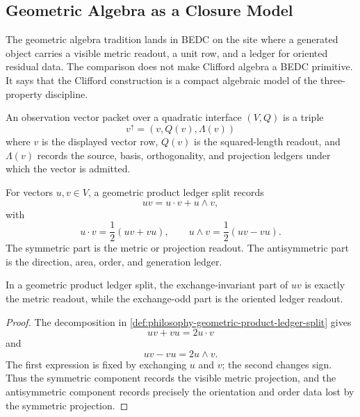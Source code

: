 \subsection{Geometric Algebra as a Closure Model}
\label{subsec:philosophy-geometric-algebra-closure-model}

\begin{definition}
\label{def:philosophy-geometric-algebra-genealogy}
The geometric algebra tradition lands in BEDC on the site where a
generated object carries a visible metric readout, a unit row, and a
ledger for oriented residual data. The comparison does not make
Clifford algebra a BEDC primitive. It says that the Clifford construction
is a compact algebraic model of the three-property discipline.
\end{definition}

\begin{definition}
\label{def:philosophy-observation-vector-packet}
An observation vector packet over a quadratic interface $(V,Q)$ is a
triple
$$
v^{\uparrow}=(v,Q(v),\Lambda(v))
$$
where $v$ is the displayed vector row, $Q(v)$ is the squared-length
readout, and $\Lambda(v)$ records the source, basis, orthogonality, and
projection ledgers under which the vector is admitted.
\end{definition}

\begin{definition}
\label{def:philosophy-geometric-product-ledger-split}
For vectors $u,v\in V$, a geometric product ledger split records
$$
uv=u\cdot v+u\wedge v,
$$
with
$$
u\cdot v=\frac12(uv+vu),
\qquad
u\wedge v=\frac12(uv-vu).
$$
The symmetric part is the metric or projection readout. The antisymmetric
part is the direction, area, order, and generation ledger.
\end{definition}

\begin{theorem}
\label{thm:philosophy-geometric-product-separates-readout-ledger}
In a geometric product ledger split, the exchange-invariant part of
$uv$ is exactly the metric readout, while the exchange-odd part is the
oriented ledger readout.
\end{theorem}
\begin{proof}
The decomposition in
\autoref{def:philosophy-geometric-product-ledger-split} gives
$$
uv+vu=2u\cdot v
$$
and
$$
uv-vu=2u\wedge v.
$$
The first expression is fixed by exchanging $u$ and $v$; the second
changes sign. Thus the symmetric component records the visible metric
projection, and the antisymmetric component records precisely the
orientation and order data lost by the symmetric projection.
\end{proof}

